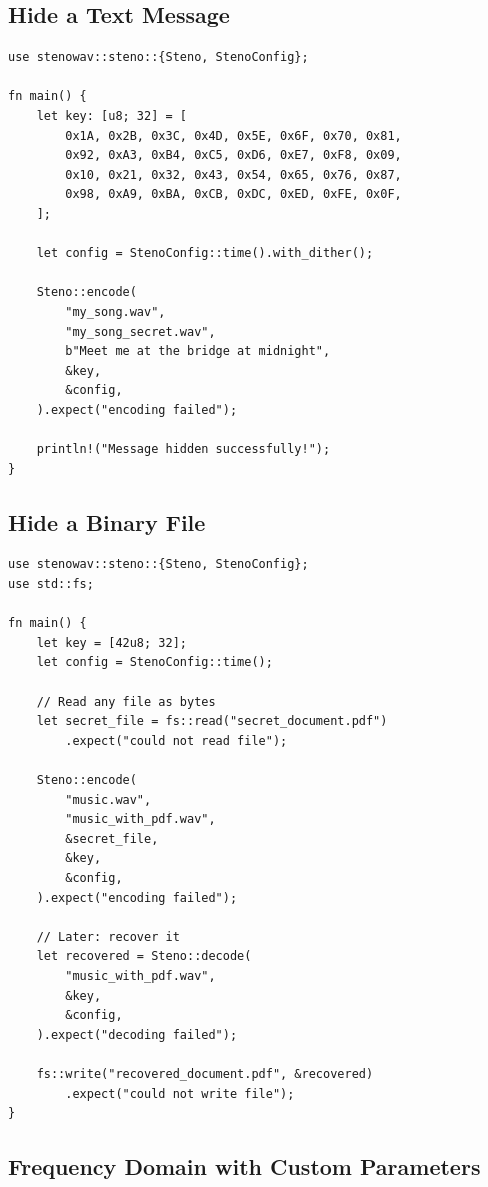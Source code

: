 \documentclass[11pt,a4paper]{article}
\begin{document}
\subsection{Hide a Text Message}

\begin{lstlisting}[style=rust]
use stenowav::steno::{Steno, StenoConfig};

fn main() {
    let key: [u8; 32] = [
        0x1A, 0x2B, 0x3C, 0x4D, 0x5E, 0x6F, 0x70, 0x81,
        0x92, 0xA3, 0xB4, 0xC5, 0xD6, 0xE7, 0xF8, 0x09,
        0x10, 0x21, 0x32, 0x43, 0x54, 0x65, 0x76, 0x87,
        0x98, 0xA9, 0xBA, 0xCB, 0xDC, 0xED, 0xFE, 0x0F,
    ];

    let config = StenoConfig::time().with_dither();

    Steno::encode(
        "my_song.wav",
        "my_song_secret.wav",
        b"Meet me at the bridge at midnight",
        &key,
        &config,
    ).expect("encoding failed");

    println!("Message hidden successfully!");
}
\end{lstlisting}

\subsection{Hide a Binary File}

\begin{lstlisting}[style=rust]
use stenowav::steno::{Steno, StenoConfig};
use std::fs;

fn main() {
    let key = [42u8; 32];
    let config = StenoConfig::time();

    // Read any file as bytes
    let secret_file = fs::read("secret_document.pdf")
        .expect("could not read file");

    Steno::encode(
        "music.wav",
        "music_with_pdf.wav",
        &secret_file,
        &key,
        &config,
    ).expect("encoding failed");

    // Later: recover it
    let recovered = Steno::decode(
        "music_with_pdf.wav",
        &key,
        &config,
    ).expect("decoding failed");

    fs::write("recovered_document.pdf", &recovered)
        .expect("could not write file");
}
\end{lstlisting}

\subsection{Frequency Domain with Custom Parameters}
\end{document}
